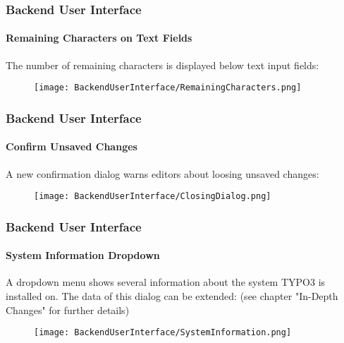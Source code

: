 \begin{frame}[fragile]
	\frametitle{Backend User Interface}
	\framesubtitle{Remaining Characters on Text Fields}

	The number of remaining characters is displayed below text input fields:

	\begin{figure}
		\texttt{[image: BackendUserInterface/RemainingCharacters.png]}
	\end{figure}

\end{frame}

\begin{frame}[fragile]
	\frametitle{Backend User Interface}
	\framesubtitle{Confirm Unsaved Changes}

	A new confirmation dialog warns editors about loosing unsaved changes:

	\begin{figure}
		\texttt{[image: BackendUserInterface/ClosingDialog.png]}
	\end{figure}

\end{frame}

\begin{frame}[fragile]
	\frametitle{Backend User Interface}
	\framesubtitle{System Information Dropdown}

	A dropdown menu shows several information about the system TYPO3 is installed on.
	The data of this dialog can be extended:\newline
	\small(see chapter "In-Depth Changes" for further details)\normalsize

	\begin{figure}
		\texttt{[image: BackendUserInterface/SystemInformation.png]}
	\end{figure}

\end{frame}

